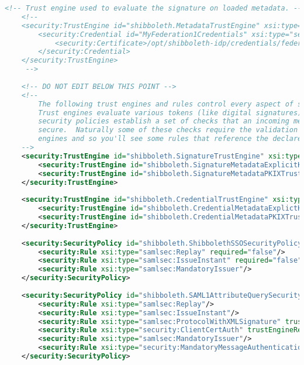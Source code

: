 \begin{lstlisting}[language=xml]
    <!-- Trust engine used to evaluate the signature on loaded metadata. -->
    <!--
    <security:TrustEngine id="shibboleth.MetadataTrustEngine" xsi:type="security:StaticExplicitKeySignature">
        <security:Credential id="MyFederation1Credentials" xsi:type="security:X509Filesystem">
            <security:Certificate>/opt/shibboleth-idp/credentials/federation1.crt</security:Certificate>
        </security:Credential>
    </security:TrustEngine>
     -->
     
    <!-- DO NOT EDIT BELOW THIS POINT -->
    <!-- 
        The following trust engines and rules control every aspect of security related to incoming messages. 
        Trust engines evaluate various tokens (like digital signatures) for trust worthiness while the 
        security policies establish a set of checks that an incoming message must pass in order to be considered
        secure.  Naturally some of these checks require the validation of the tokens evaluated by the trust 
        engines and so you'll see some rules that reference the declared trust engines.
    -->
    <security:TrustEngine id="shibboleth.SignatureTrustEngine" xsi:type="security:SignatureChaining">
        <security:TrustEngine id="shibboleth.SignatureMetadataExplicitKeyTrustEngine" xsi:type="security:MetadataExplicitKeySignature" metadataProviderRef="ShibbolethMetadata"/>                              
        <security:TrustEngine id="shibboleth.SignatureMetadataPKIXTrustEngine" xsi:type="security:MetadataPKIXSignature" metadataProviderRef="ShibbolethMetadata"/>
    </security:TrustEngine>
    
    <security:TrustEngine id="shibboleth.CredentialTrustEngine" xsi:type="security:Chaining">
        <security:TrustEngine id="shibboleth.CredentialMetadataExplictKeyTrustEngine" xsi:type="security:MetadataExplicitKey" metadataProviderRef="ShibbolethMetadata"/>
        <security:TrustEngine id="shibboleth.CredentialMetadataPKIXTrustEngine" xsi:type="security:MetadataPKIXX509Credential" metadataProviderRef="ShibbolethMetadata"/>
    </security:TrustEngine>
     
    <security:SecurityPolicy id="shibboleth.ShibbolethSSOSecurityPolicy" xsi:type="security:SecurityPolicyType">
        <security:Rule xsi:type="samlsec:Replay" required="false"/>
        <security:Rule xsi:type="samlsec:IssueInstant" required="false"/>
        <security:Rule xsi:type="samlsec:MandatoryIssuer"/>
    </security:SecurityPolicy>
    
    <security:SecurityPolicy id="shibboleth.SAML1AttributeQuerySecurityPolicy" xsi:type="security:SecurityPolicyType">
        <security:Rule xsi:type="samlsec:Replay"/>
        <security:Rule xsi:type="samlsec:IssueInstant"/>
        <security:Rule xsi:type="samlsec:ProtocolWithXMLSignature" trustEngineRef="shibboleth.SignatureTrustEngine"/>
        <security:Rule xsi:type="security:ClientCertAuth" trustEngineRef="shibboleth.CredentialTrustEngine"/>
        <security:Rule xsi:type="samlsec:MandatoryIssuer"/>
        <security:Rule xsi:type="security:MandatoryMessageAuthentication"/>
    </security:SecurityPolicy>
    

\end{lstlisting}
